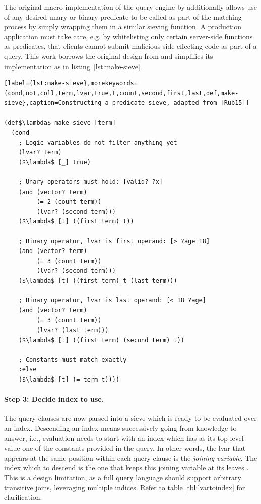 The original macro implementation of the query engine by \cite{rubin15aosadb} additionally allows use of any desired unary or binary predicate to be called as part of the matching process by simply wrapping them in a similar sieving function. A production application must take care, e.g. by whitelisting only certain server-side functions as predicates, that clients cannot submit malicious side-effecting code as part of a query. This work borrows the original design from \cite{rubin15aosadb} and simplifies its implementation as in listing~\ref{lst:make-sieve}.


\begin{lstlisting}[label={lst:make-sieve},morekeywords={cond,not,coll,term,lvar,true,t,count,second,first,last,def,make-sieve},caption=Constructing a predicate sieve, adapted from [Rub15]]

(def$\lambda$ make-sieve [term]
  (cond
    ; Logic variables do not filter anything yet
    (lvar? term)
    ($\lambda$ [_] true)

    ; Unary operators must hold: [valid? ?x]
    (and (vector? term)
         (= 2 (count term))
         (lvar? (second term)))
    ($\lambda$ [t] ((first term) t))

    ; Binary operator, lvar is first operand: [> ?age 18]
    (and (vector? term)
         (= 3 (count term))
         (lvar? (second term)))
    ($\lambda$ [t] ((first term) t (last term)))

    ; Binary operator, lvar is last operand: [< 18 ?age]
    (and (vector? term)
         (= 3 (count term))
         (lvar? (last term)))
    ($\lambda$ [t] ((first term) (second term) t))

    ; Constants must match exactly
    :else
    ($\lambda$ [t] (= term t))))

\end{lstlisting}


\cleardoublepage
\paragraph{Step 3: Decide index to use.}
The query clauses are now parsed into a sieve which is ready to be evaluated over an index. Descending an index means successively going from knowledge to answer, i.e., evaluation needs to start with an index which has as its top level value one of the constants provided in the query. In other words, the lvar that appears at the same position within each query clause is the \emph{joining variable}. The index which to descend is the one that keeps this joining variable at its leaves \cite{rubin15aosadb}. This is a design limitation, as a full query language should support arbitrary transitive joins, leveraging multiple indices. Refer to table \ref{tbl:lvartoindex} for clarification.

